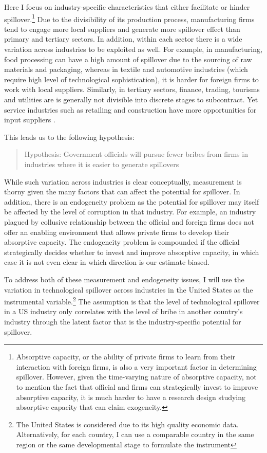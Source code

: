 Here I focus on industry-specific characteristics that either facilitate or hinder spillover.\footnote{Absorptive capacity, or the ability of private firms to learn from their interaction with foreign firms, is also a very important factor in determining spillover. However, given the time-varying nature of absorptive capacity, not to mention the fact that official and firms can strategically invest to improve absorptive capacity, it is much harder to have a research design studying absorptive capacity that can claim exogeneity.} Due to the divisibility of its production process, manufacturing firms tend to engage more local suppliers and generate more spillover effect than primary and tertiary sectors. In addition, within each sector there is a wide variation across industries to be exploited as well. For example, in manufacturing, food processing can have a high amount of spillover due to the sourcing of raw materials and packaging, whereas in textile and automotive industries (which require high level of technological sophistication), it is harder for foreign firms to work with local suppliers. Similarly, in tertiary sectors, finance, trading, tourisms and utilities are is generally not divisible into discrete stages to subcontract. Yet service industries such as retailing and construction have more opportunities for input suppliers \citep[138]{UNCTAD2001}.

This leads us to the following hypothesis:

\begin{quote}
Hypothesis: Government officials will pursue fewer bribes from firms in industries where it is easier to generate spillovers
\end{quote}

While such variation across industries is clear conceptually, measurement is thorny given the many factors that can affect the potential for spillover. In addition, there is an endogeneity problem as the potential for spillover may itself be affected by the level of corruption in that industry. For example, an industry plagued by collusive relationship between the official and foreign firms does not offer an enabling environment that allows private firms to develop their absorptive capacity. The endogeneity problem is compounded if the official strategically decides whether to invest and improve absorptive capacity, in which case it is not even clear in which direction is our estimate biased.

To address both of these measurement and endogeneity issues, I will use the variation in technological spillover across industries in the United States as the instrumental variable.\footnote{The United States is considered due to its high quality economic data. Alternatively, for each country, I can use a comparable country in the same region or the same developmental stage to formulate the instrument} The assumption is that the level of technological spillover in a US industry only correlates with the level of bribe in another country's industry through the latent factor that is the industry-specific potential for spillover.

